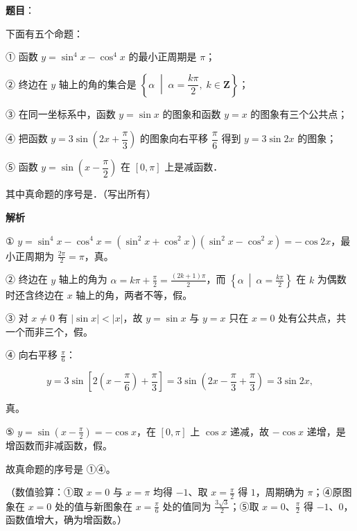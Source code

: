 \begin{answer}

\textbf{题目}：

下面有五个命题：

① 函数 $y=\sin^4x-\cos^4x$ 的最小正周期是 $\pi$；

② 终边在 $y$ 轴上的角的集合是 $\left\{\alpha\;\middle|\;\alpha=\dfrac{k\pi}{2},\;k\in\mathbf Z\right\}$；

③ 在同一坐标系中，函数 $y=\sin x$ 的图象和函数 $y=x$ 的图象有三个公共点；

④ 把函数 $y=3\sin\left(2x+\dfrac{\pi}{3}\right)$ 的图象向右平移 $\dfrac{\pi}{6}$ 得到 $y=3\sin2x$ 的图象；

⑤ 函数 $y=\sin\left(x-\dfrac{\pi}{2}\right)$ 在 $[0,\pi]$ 上是减函数．

其中真命题的序号是\gkblank{}．（写出所有）

\textbf{解析}

① $y=\sin^{4}x-\cos^{4}x=(\sin^{2}x+\cos^{2}x)(\sin^{2}x-\cos^{2}x)=-\cos2x$，最小正周期为 $\frac{2\pi}{2}=\pi$，真。

② 终边在 $y$ 轴上的角为 $\alpha=k\pi+\frac{\pi}{2}=\frac{(2k+1)\pi}{2}$，而 $\left\{\alpha\ \middle|\ \alpha=\frac{k\pi}{2}\right\}$ 在 $k$ 为偶数时还含终边在 $x$ 轴上的角，两者不等，假。

③ 对 $x\ne0$ 有 $|\sin x|<|x|$，故 $y=\sin x$ 与 $y=x$ 只在 $x=0$ 处有公共点，共一个而非三个，假。

④ 向右平移 $\frac{\pi}{6}$：

\nopagebreak[4]
\[y=3\sin\left[2\left(x-\frac{\pi}{6}\right)+\frac{\pi}{3}\right]=3\sin\left(2x-\frac{\pi}{3}+\frac{\pi}{3}\right)=3\sin2x,\]

真。

⑤ $y=\sin\left(x-\frac{\pi}{2}\right)=-\cos x$，在 $[0,\pi]$ 上 $\cos x$ 递减，故 $-\cos x$ 递增，是增函数而非减函数，假。

故真命题的序号是 ①④。

（数值验算：①取 $x=0$ 与 $x=\pi$ 均得 $-1$、取 $x=\frac{\pi}{2}$ 得 $1$，周期确为 $\pi$；④原图象在 $x=0$ 处的值与新图象在 $x=\frac{\pi}{6}$ 处的值同为 $\frac{3\sqrt3}{2}$；⑤取 $x=0$、$\frac{\pi}{2}$ 得 $-1$、$0$，函数值增大，确为增函数。）


\end{answer}
